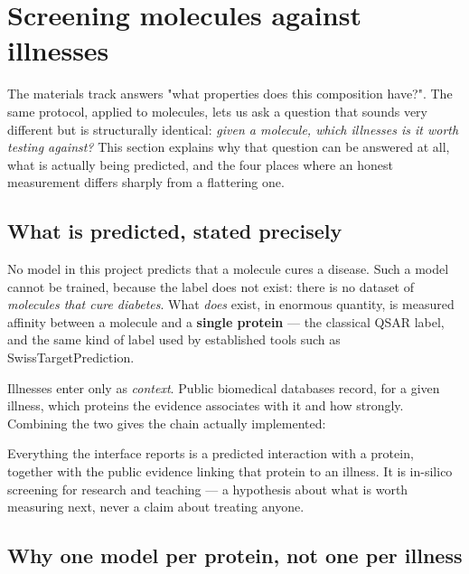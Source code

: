 \section{Screening molecules against illnesses}
\label{sec:illness}

The materials track answers "what properties does this composition have?". The same protocol,
applied to molecules, lets us ask a question that sounds very different but is structurally
identical: \emph{given a molecule, which illnesses is it worth testing against?} This section
explains why that question can be answered at all, what is actually being predicted, and the four
places where an honest measurement differs sharply from a flattering one.

\subsection{What is predicted, stated precisely}

No model in this project predicts that a molecule cures a disease. Such a model cannot be trained,
because the label does not exist: there is no dataset of \emph{molecules that cure diabetes}. What
\emph{does} exist, in enormous quantity, is measured affinity between a molecule and a
\textbf{single protein} --- the classical QSAR label, and the same kind of label used by
established tools such as SwissTargetPrediction.

Illnesses enter only as \emph{context}. Public biomedical databases record, for a given illness,
which proteins the evidence associates with it and how strongly. Combining the two gives the
chain actually implemented:

\begin{center}
\end{center}

Everything the interface reports is a predicted interaction with a protein, together with the
public evidence linking that protein to an illness. It is in-silico screening for research and
teaching --- a hypothesis about what is worth measuring next, never a claim about treating anyone.

\subsection{Why one model per protein, not one per illness}

